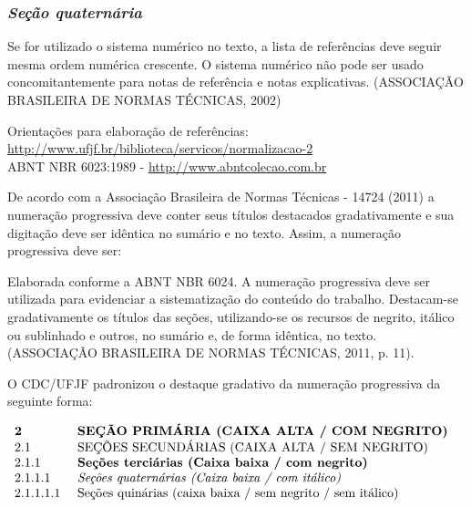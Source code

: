 \documentclass[
        12pt,
        openany, %
        oneside, %
        a4paper,			
        english,			
        brazil			        %
        ]{abntbibufjf}
\begin{document}
\subsubsection{\textit{Se\c{c}\~ao quatern\'aria}} %

Se for utilizado o sistema num\'erico no texto, a lista de refer\^encias deve
seguir mesma ordem num\'erica crescente. O sistema num\'erico n\~ao pode ser usado
concomitantemente para notas de refer\^encia e notas explicativas. (ASSOCIA\c{C}\~AO BRASILEIRA DE NORMAS T\'ECNICAS, 2002)

Orienta\c{c}\~oes para elabora\c{c}\~ao de refer\^encias: \\
\url{http://www.ufjf.br/biblioteca/servicos/normalizacao-2} \\
ABNT NBR 6023:1989 - \url{http://www.abntcolecao.com.br}


De acordo com a Associa\c{c}\~ao Brasileira de Normas T\'ecnicas - 14724 (2011) a numera\c{c}\~ao 
progressiva deve conter seus t\'itulos destacados gradativamente e sua digita\c{c}\~ao deve 
ser id\^entica no sum\'ario e no texto. Assim, a numera\c{c}\~ao progressiva deve ser: 
\begin{citacao}
Elaborada conforme a ABNT NBR 6024. A numera\c{c}\~ao progressiva deve ser utilizada para 
evidenciar a sistematiza\c{c}\~ao do conte\'udo do trabalho. Destacam-se gradativamente os 
t\'itulos das se\c{c}\~oes, utilizando-se os recursos de negrito, it\'alico ou sublinhado e 
outros, no sum\'ario e, de forma id\^entica, no texto. (ASSOCIA\c{C}\~AO BRASILEIRA DE NORMAS 
T\'ECNICAS, 2011, p. 11).
\end{citacao}

O CDC/UFJF padronizou o destaque gradativo da numera\c{c}\~ao progressiva da seguinte forma: 

$
\begin{array}{ll}
\textbf{2} & \mbox{ \textbf{SE\c{C}\~AO PRIM\'ARIA (CAIXA ALTA / COM NEGRITO)}}\\
2.1 & \mbox{ SE\c{C}\~OES SECUND\'ARIAS (CAIXA ALTA / SEM NEGRITO)}\\
2.1.1 & \mbox{ \textbf{Se\c{c}\~oes terci\'arias (Caixa baixa / com negrito)}} \\
2.1.1.1 & \mbox{ \textit{Se\c{c}\~oes quatern\'arias (Caixa baixa / com it\'alico)}} \\
2.1.1.1.1 & \mbox{ Se\c{c}\~oes quin\'arias (caixa baixa / sem negrito / sem it\'alico)}
\end{array}
$
\end{document}
